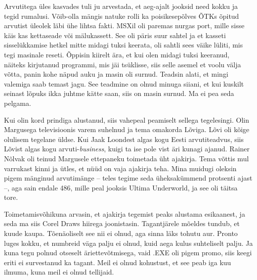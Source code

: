 Arvutitega üles kasvades tuli ju arvestada, et aeg-ajalt 
jooksid need kokku ja tegid rumalusi. Võib-olla mängis natuke 
rolli ka poisikesepõlves ÕTKs õpitud arvutist üleolek läbi ühe lihtsa fakti. 
MSXil oli paremas nurgas port, mille sisse käis kas 
kettaseade või mälukassett. See oli päris suur 
sahtel ja et kasseti sisselükkamise hetkel mitte midagi tuksi 
keerata, oli sahtli sees väike lüliti, mis tegi masinale reseti. 
Õppisin kiirelt ära, et kui olen midagi tuksi keeranud, näiteks 
kirjutanud programmi, mis jäi tsüklisse, siis selle asemel et voolu välja 
võtta, panin kohe näpud auku ja masin oli surnud. Teadsin alati, et 
mingi valemiga saab temast jagu. See teadmine on olnud minuga siiani, et kui 
kuskilt seinast lõpuks ikka juhtme kätte saan, siis on masin surnud. Ma ei pea 
seda pelgama.


Kui olin kord prindiga alustanud, siis vahepeal peamiselt sellega tegelesingi. Olin 
Margusega televisioonis varem suhelnud ja tema omakorda Lõviga. Lõvi oli kõige olulisem 
tegelane üldse. Kui Jaak Loondest algas kogu Eesti arvutiteadvus, siis 
Lõvist algas kogu arvuti-\emph{business}, kuigi ta ise pole vist 
äri kunagi ajanud. 
Rainer Nõlvak oli teinud Margusele ettepaneku 
toimetada üht ajakirja. Tema võttis mul varrukast kinni ja ütles, 
et nüüd on vaja ajakirja teha. Mina muidugi oleksin pigem 
mänginud arvutimänge – teles tegime seda üheksakümmend 
protsenti ajast –, aga sain endale 486, mille peal jooksis Ultima 
Underworld, ja see oli täitsa tore. 

Toimetamisvõhikuna arvasin, et ajakirja tegemist peaks alustama 
esikaanest, ja seda ma siis Corel Draws hiirega 
joonistasin. Tagantjärele mõeldes tundub, et 
kuude kaupa. Tõenäoliselt see nii ei olnud, aga sinna läks tohutu aur. 
Pronto luges kokku, et numbreid väga palju ei olnud, kuid aega kulus 
suhteliselt palju. Ja kuna tegu polnud otseselt 
äriettevõtmisega, vaid .EXE oli pigem promo, siis keegi eriti ei 
survestanud ka tagant. Meil ei olnud kohustust, et see peab iga kuu ilmuma, kuna meil ei olnud 
tellijaid.

